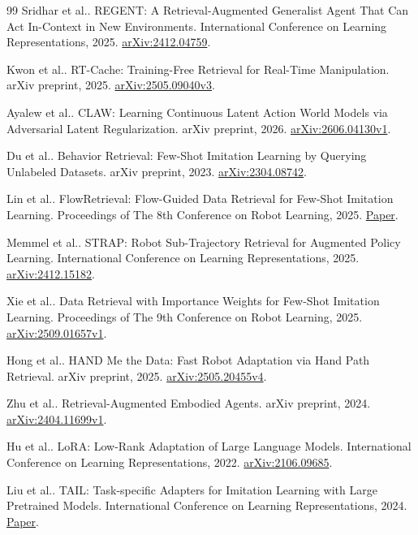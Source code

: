 \documentclass[11pt]{article}
\begin{document}
\begin{thebibliography}{99}
 Sridhar et al.. REGENT: A Retrieval-Augmented Generalist Agent That Can Act In-Context in New Environments. International Conference on Learning Representations, 2025. \href{https://arxiv.org/abs/2412.04759}{arXiv:2412.04759}.

 Kwon et al.. RT-Cache: Training-Free Retrieval for Real-Time Manipulation. arXiv preprint, 2025. \href{https://arxiv.org/abs/2505.09040v3}{arXiv:2505.09040v3}.

 Ayalew et al.. CLAW: Learning Continuous Latent Action World Models via Adversarial Latent Regularization. arXiv preprint, 2026. \href{https://arxiv.org/abs/2606.04130v1}{arXiv:2606.04130v1}.

 Du et al.. Behavior Retrieval: Few-Shot Imitation Learning by Querying Unlabeled Datasets. arXiv preprint, 2023. \href{https://arxiv.org/abs/2304.08742}{arXiv:2304.08742}.

 Lin et al.. FlowRetrieval: Flow-Guided Data Retrieval for Few-Shot Imitation Learning. Proceedings of The 8th Conference on Robot Learning, 2025. \href{https://proceedings.mlr.press/v270/lin25a.html}{Paper}.

 Memmel et al.. STRAP: Robot Sub-Trajectory Retrieval for Augmented Policy Learning. International Conference on Learning Representations, 2025. \href{https://arxiv.org/abs/2412.15182}{arXiv:2412.15182}.

 Xie et al.. Data Retrieval with Importance Weights for Few-Shot Imitation Learning. Proceedings of The 9th Conference on Robot Learning, 2025. \href{https://arxiv.org/abs/2509.01657v1}{arXiv:2509.01657v1}.

 Hong et al.. HAND Me the Data: Fast Robot Adaptation via Hand Path Retrieval. arXiv preprint, 2025. \href{https://arxiv.org/abs/2505.20455v4}{arXiv:2505.20455v4}.

 Zhu et al.. Retrieval-Augmented Embodied Agents. arXiv preprint, 2024. \href{https://arxiv.org/abs/2404.11699v1}{arXiv:2404.11699v1}.

 Hu et al.. LoRA: Low-Rank Adaptation of Large Language Models. International Conference on Learning Representations, 2022. \href{https://arxiv.org/abs/2106.09685}{arXiv:2106.09685}.

 Liu et al.. TAIL: Task-specific Adapters for Imitation Learning with Large Pretrained Models. International Conference on Learning Representations, 2024. \href{https://proceedings.iclr.cc/paper_files/paper/2024/hash/46e2b525da536030ec1589dddea01feb-Abstract-Conference.html}{Paper}.


\end{thebibliography}
\end{document}
